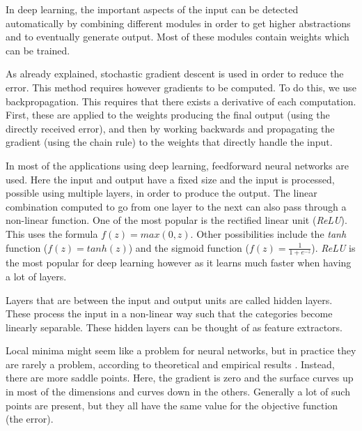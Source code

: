 \documentclass[a4paper]{article}
\begin{document}
In deep learning, the important aspects of the input can be detected automatically by combining different modules in order to get higher abstractions and to eventually generate output.
Most of these modules contain weights which can be trained.

As already explained, stochastic gradient descent is used in order to reduce the error. This method requires however gradients to be computed. To do this, we use backpropagation. This requires that there exists a derivative of each computation. First, these are applied to the weights producing the final output (using the directly received error), and then by working backwards and propagating the gradient (using the chain rule) to the weights that directly handle the input.

In most of the applications using deep learning, feedforward neural networks are used. Here the input and output have a fixed size and the input is processed, possible using multiple layers, in order to produce the output.
The linear combination computed to go from one layer to the next can also pass through a non-linear function. One of the most popular is the rectified linear unit (\textit{ReLU}). This uses the formula $f(z) = max(0,z)$. Other possibilities include the \textit{tanh} function ($f(z) = tanh(z)$) and the sigmoid function ($f(z) = \frac{1}{1 + e^{-z}}$). \textit{ReLU} is the most popular for deep learning however as it learns much faster when having a lot of layers.

Layers that are between the input and output units are called hidden layers. These process the input in a non-linear way such that the categories become linearly separable. These hidden layers can be thought of as feature extractors.

Local minima might seem like a problem for neural networks, but in practice they are rarely a problem, according to theoretical and empirical results \citep{choromanska2015loss}.
Instead, there are more saddle points. Here, the gradient is zero and the surface curves up in most of the dimensions and curves down in the others. Generally a lot of such points are present, but they all have the same value for the objective function (the error).\\
\end{document}
